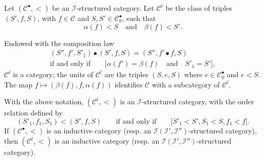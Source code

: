 \documentclass[a4paper,fleqn]{article}
\theoremstyle{plain}
\newenvironment{proposition}[1]
  {\renewcommand\theinnerproposition{#1}\innerproposition}
  {\endinnerproposition}
\theoremstyle{definition}
\newcommand{\textand}{\quad\text{and}\quad}
\newcommand{\CC}{\mathcal{C}}
\newcommand{\II}{\mathcal{I}}
\begin{document}
Let $(\CC^\bullet,<)$ be an $\II$-structured category.
Let $\CC^l$ be the class of triples $(S',f,S)$, with $f\in\CC$ and $S,S'\in\CC_0^\bullet$, such that
\[
  \alpha(f)<S
  \textand
  \beta(f)<S'.
\]

Endowed with the composition law
\[
  \begin{gathered}
    (S'',f',S'_1)\bullet(S',f,S)
    = (S'',f'\bullet f,S)
  \\\text{if and only if}\qquad
    \big[\alpha(f')=\beta(f)\textand S'_1=S'\big],
  \end{gathered}
\]
$\CC^l$ is a category;
the units of $\CC^l$ are the triples $(S,e,S)$ where $e\in\CC_0^\bullet$ and $e<S$.
The map $f\mapsto(\beta(f),f,\alpha(f))$ identifies $\CC$ with a subcategory of $\CC^l$.

\begin{proposition}{26}
\label{proposition:ii-26}
  With the above notation, $(\CC^l,<)$ is an $\II$-structured category, with the order relation defined by
  \[
    (S'_1,f_1,S_1)<(S',f,S)
    \qquad\text{if and only if}\qquad
    \big[
      S'_1<S', S_1<S, f_1<f
    \big].
  \]
  If $(\CC^\bullet,<)$ is an inductive category (resp. an $\II(\II',\II'')$-structured category), then $(\CC^l,<)$ is an inductive category (resp. an $\II(\II',\II'')$-structured category).
\end{proposition}
\end{document}
